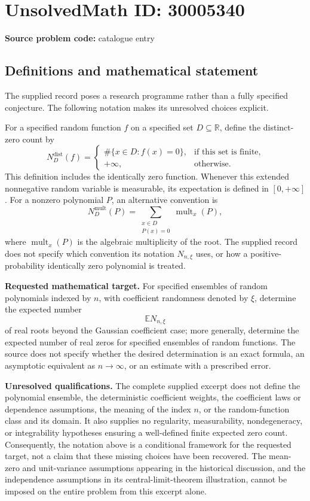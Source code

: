 \documentclass[11pt]{article}
\newcommand{\R}{\mathbb{R}}
\newcommand{\E}{\mathbb{E}}
\begin{document}
\section*{UnsolvedMath ID: 30005340}
\textbf{Source problem code:} catalogue entry
\subsection{Definitions and mathematical statement}
The supplied record poses a research programme rather than a fully specified conjecture. The following notation makes its unresolved choices explicit.

For a specified random function \(f\) on a specified set \(D\subseteq\R\), define the distinct-zero count by
\[
N_D^{\mathrm{dist}}(f)=\begin{cases}
\#\{x\in D:f(x)=0\},&\text{if this set is finite},\\
+\infty,&\text{otherwise}.
\end{cases}
\]
This definition includes the identically zero function. Whenever this extended nonnegative random variable is measurable, its expectation is defined in \([0,+\infty]\). For a nonzero polynomial \(P\), an alternative convention is
\[
N_D^{\mathrm{mult}}(P)=\sum_{\substack{x\in D\\P(x)=0}}\operatorname{mult}_x(P),
\]
where \(\operatorname{mult}_x(P)\) is the algebraic multiplicity of the root. The supplied record does not specify which convention its notation \(N_{n,\xi}\) uses, or how a positive-probability identically zero polynomial is treated.

\textbf{Requested mathematical target.} For specified ensembles of random polynomials indexed by \(n\), with coefficient randomness denoted by \(\xi\), determine the expected number
\[
\E N_{n,\xi}
\]
of real roots beyond the Gaussian coefficient case; more generally, determine the expected number of real zeros for specified ensembles of random functions. The source does not specify whether the desired determination is an exact formula, an asymptotic equivalent as \(n\to\infty\), or an estimate with a prescribed error.

\textbf{Unresolved qualifications.} The complete supplied excerpt does not define the polynomial ensemble, the deterministic coefficient weights, the coefficient laws or dependence assumptions, the meaning of the index \(n\), or the random-function class and its domain. It also supplies no regularity, measurability, nondegeneracy, or integrability hypotheses ensuring a well-defined finite expected zero count. Consequently, the notation above is a conditional framework for the requested target, not a claim that these missing choices have been recovered. The mean-zero and unit-variance assumptions appearing in the historical discussion, and the independence assumptions in its central-limit-theorem illustration, cannot be imposed on the entire problem from this excerpt alone.
\end{document}
